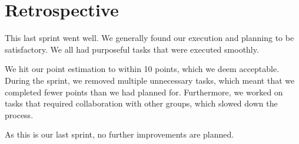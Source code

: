 \section{Retrospective}\label{sec:sprint6retrospective}
This last sprint went well. We generally found our execution and planning to be satisfactory. We all had purposeful tasks that were executed smoothly.

We hit our point estimation to within 10 points, which we deem acceptable. During the sprint, we removed multiple unnecessary tasks, which meant that we completed fewer points than we had planned for. Furthermore, we worked on tasks that required collaboration with other groups, which slowed down the process.

As this is our last sprint, no further improvements are planned.